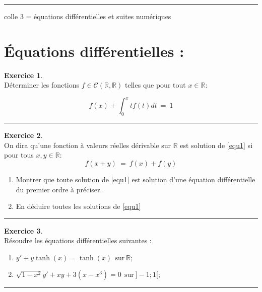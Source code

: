 \documentclass[10pt,a4paper]{article}
\newcommand{\R}{\mathbb{R}}
\theoremstyle{definition}
\theoremstyle{definition}
\newtheorem{exo}{Exercice}
\begin{document}
	
	\rule[0.5ex]{\textwidth}{0.1mm}	
	
	\begin{center}
		\Large \sc colle 3 = équations différentielles	et suites numériques
	\end{center}
	


\section*{ Équations différentielles :}
\begin{center}
\begin{minipage}[t]{0.47\linewidth}
\raggedright

\begin{exo}\quad\\
Déterminer les fonctions $f\in\mathcal{C}(\R,\R)$ telles que pour tout $x\in\R$:

$$f(x)  + \int_{0}^{x}tf(t)dt \ = \ 1$$

\end{exo}
\begin{center}
\rule{1\linewidth}{0.6pt}
\end{center} 

\begin{exo}\quad\\ 
On dira qu'une fonction à valeurs réelles dérivable sur $\R$ est solution de \eqref{equ1} si pour tous $x,y\in\R$:
\begin{equation}
f(x+y) \ = \ f(x) + f(y)
\label{equ1}
\end{equation}

\begin{enumerate}
\item Montrer que toute solution de \eqref{equ1} est solution d'une équation différentielle du premier ordre à préciser.
\item En déduire toutes les solutions de \eqref{equ1}

\end{enumerate}
\end{exo}
\begin{center}
\rule{1\linewidth}{0.6pt}
\end{center}

\begin{exo}\quad\\
Résoudre les équations différentielles suivantes :
\begin{enumerate}
\item $y' + y\tanh(x) = \tanh(x)  \ \  \text{sur} \ \R;$
\item$\sqrt{1-x^2}y'  + xy + 3(x-x^3)  = 0 \  \ \text{sur} \  ]-1;1[; $
\end{enumerate}
\end{exo} 
\begin{center}
\rule{1\linewidth}{0.6pt}
\end{center}



\end{minipage}
\end{center}
\end{document}
